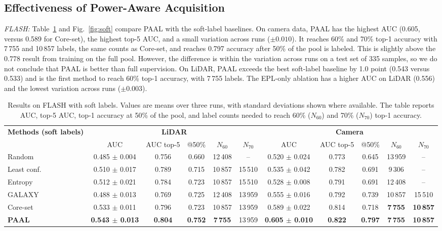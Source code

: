 \documentclass[journal,onecolumn]{IEEEtran}
\begin{document}
\subsection{Effectiveness of Power-Aware Acquisition}
\emph{FLASH:} Table~\ref{tab:s3} and Fig.~\ref{fig:soft} compare PAAL with the soft-label baselines. On camera data, PAAL has the highest AUC (0.605, versus 0.589 for Core-set), the highest top-5 AUC, and a small variation across runs ($\pm 0.010$). It reaches 60\% and 70\% top-1 accuracy with 7\,755 and 10\,857 labels, the same counts as Core-set, and reaches 0.797 accuracy after 50\% of the pool is labeled. This is slightly above the 0.778 result from training on the full pool. However, the difference is within the variation across runs on a test set of 335 samples, so we do not conclude that PAAL is better than full supervision. On LiDAR, PAAL exceeds the best soft-label baseline by 1.0 point (0.543 versus 0.533) and is the first method to reach 60\% top-1 accuracy, with 7\,755 labels. The EPL-only ablation has a higher AUC on LiDAR (0.556) and the lowest variation across runs ($\pm 0.003$).

\begin{table}[!t]
  \renewcommand{\arraystretch}{1.2}
  \caption{Results on FLASH with soft labels. Values are means over three runs, with standard deviations shown where available. The table reports AUC, top-5 AUC, top-1 accuracy at 50\% of the pool, and label counts needed to reach 60\% ($N_{60}$) and 70\% ($N_{70}$) top-1 accuracy.}
  \label{tab:s3}
  \centering
  \footnotesize
  \setlength{\tabcolsep}{4pt}
  \begin{tabular}{|l|c|c|c|c|c||c|c|c|c|c|}
    \hline
    \multirow{2}{*}{\textbf{Methods (soft labels)}} & \multicolumn{5}{c||}{\textbf{LiDAR}} & \multicolumn{5}{c|}{\textbf{Camera}} \\
    \cline{2-11}
    & AUC & AUC top-5 & @50\% & $N_{60}$ & $N_{70}$ & AUC & AUC top-5 & @50\% & $N_{60}$ & $N_{70}$ \\
    \hline
    Random      & 0.485 $\pm$ 0.004 & 0.756 & 0.660 & 12\,408 & -- & 0.520 $\pm$ 0.024 & 0.773 & 0.645 & 13\,959 & -- \\
    Least conf. & 0.510 $\pm$ 0.017 & 0.789 & 0.715 & 10\,857 & 15\,510 & 0.535 $\pm$ 0.042 & 0.782 & 0.691 & 9\,306 & -- \\
    Entropy     & 0.512 $\pm$ 0.021 & 0.784 & 0.723 & 10\,857 & 15\,510 & 0.528 $\pm$ 0.008 & 0.791 & 0.691 & 12\,408 & -- \\
    GALAXY      & 0.488 $\pm$ 0.013 & 0.769 & 0.725 & 12\,408 & 13\,959 & 0.555 $\pm$ 0.016 & 0.792 & 0.739 & 10\,857 & 15\,510 \\
    Core-set    & 0.533 $\pm$ 0.011 & 0.796 & 0.723 & 10\,857 & 13\,959 & 0.589 $\pm$ 0.022 & 0.814 & 0.718 & \textbf{7\,755} & \textbf{10\,857} \\
    \hline
    \textbf{PAAL}      & \textbf{0.543 $\pm$ 0.013} & \textbf{0.804} & \textbf{0.752} & \textbf{7\,755} & 13\,959 & \textbf{0.605 $\pm$ 0.010} & \textbf{0.822} & \textbf{0.797} & \textbf{7\,755} & \textbf{10\,857} \\
    \hline
  \end{tabular}
\end{table}
\end{document}
